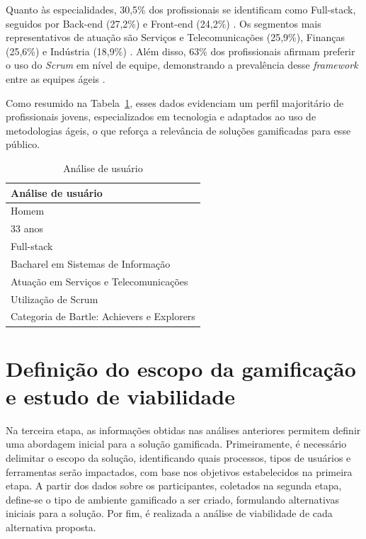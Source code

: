 \documentclass[
	12pt,
	openright,
	twoside,
	a4paper,
	english,
	brazil
	]{abntex2}
\begin{document}
Quanto às especialidades, 30,5\% dos profissionais se identificam como Full-stack, seguidos por Back-end (27,2\%) e Front-end (24,2\%) \cite{revelo2021tecnologia}. Os segmentos mais representativos de atuação são Serviços e Telecomunicações (25,9\%), Finanças (25,6\%) e Indústria (18,9\%) \cite{abes2023mercado}. Além disso, 63\% dos profissionais afirmam preferir o uso do \textit{Scrum} em nível de equipe, demonstrando a prevalência desse \textit{framework} entre as equipes ágeis \cite{17_agile_report}.

Como resumido na Tabela~\ref{tab:analise_usuario}, esses dados evidenciam um perfil majoritário de profissionais jovens, especializados em tecnologia e adaptados ao uso de metodologias ágeis, o que reforça a relevância de soluções gamificadas para esse público.

\begin{table}[H]
  \centering
  \caption{Análise de usuário}
  \label{tab:analise_usuario}
  \begin{tabular}{|p{8cm}|}
  \hline
  \textbf{Análise de usuário} \\ \hline
  Homem \\ \hline
  33 anos \\ \hline
  Full-stack \\ \hline
  Bacharel em Sistemas de Informação \\ \hline
  Atuação em Serviços e Telecomunicações \\ \hline
  Utilização de Scrum \\ \hline
  Categoria de Bartle: Achievers e Explorers \\ \hline
  \end{tabular}
\end{table}

\section{Definição do escopo da gamificação e estudo de viabilidade}

Na terceira etapa, as informações obtidas nas análises anteriores permitem definir uma abordagem inicial para a solução gamificada. Primeiramente, é necessário delimitar o escopo da solução, identificando quais processos, tipos de usuários e ferramentas serão impactados, com base nos objetivos estabelecidos na primeira etapa. A partir dos dados sobre os participantes, coletados na segunda etapa, define-se o tipo de ambiente gamificado a ser criado, formulando alternativas iniciais para a solução. Por fim, é realizada a análise de viabilidade de cada alternativa proposta.
\end{document}
